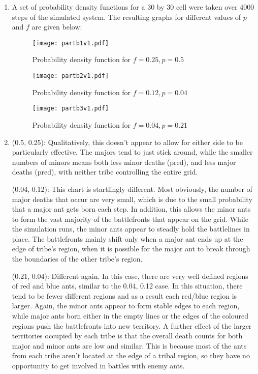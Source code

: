\begin{enumerate}
\item A set of probability density functions for a 30 by 30 cell were taken 
over 4000 steps of the simulated system.  The resulting graphs for different
values of $p$ and $f$ are given below:

\begin{figure}[h!]
\centering
\texttt{[image: partb1v1.pdf]}
\caption{Probability density function for $f = 0.25, p = 0.5$}
\label{partb1fig}
\end{figure}

\begin{figure}[h!]
\centering
\texttt{[image: partb2v1.pdf]}
\caption{Probability density function for $f = 0.12, p = 0.04$}
\label{partb2fig}
\end{figure}

\begin{figure}[h!]
\centering
\texttt{[image: partb3v1.pdf]}
\caption{Probability density function for $f = 0.04, p = 0.21$}
\label{partb3fig}
\end{figure}

\item (0.5, 0.25): Qualitatively, this doesn't appear to allow for either side to be 
particularly effective.  The majors tend to just stick around, while the 
smaller numbers of minors means both less minor deaths (pred), and less major 
deaths (pred), with neither tribe controlling the entire grid.

(0.04, 0.12): This chart is startlingly different.  Most obviously, the number 
of major deaths that occur are very small, which is due to the small 
probability that a major ant gets born each step.  In addition, this allows the 
minor ants to form the vast majority of the battlefronts that appear on the 
grid.  While the simulation runs, the minor ants appear to steadly hold the 
battlelines in place.  The battlefronts mainly shift only when a major ant ends 
up at the edge of tribe's region, when it is possible for the major ant to 
break through the boundaries of the other tribe's region.

(0.21, 0.04): Different again.  In this case, there are very well defined 
regions of red and blue ants, similar to the 0.04, 0.12 case.  In this 
situation, there tend to be fewer different regions and as a result each 
red/blue region is larger.  Again, the minor ants appear to form stable edges 
to each region, while major ants born either in the empty lines or the edges of 
the coloured regions push the battlefronts into new territory.  A further 
effect of the larger territories occupied by each tribe is that the overall 
death counts for both major and minor ants are low and similar.  This is 
because most of the ants from each tribe aren't located at the edge of a tribal 
region, so they have no opportunity to get involved in battles with enemy ants.


\end{enumerate}
